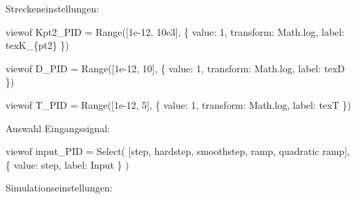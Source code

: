 \documentclass[
  letterpaper,
  DIV=11]{scrreprt}
\newenvironment{Shaded}{\begin{snugshade}}{\end{snugshade}}
\newcommand{\NormalTok}[1]{\textcolor[rgb]{0.00,0.23,0.31}{#1}}
\begin{document}
Streckeneinstellungen:

\begin{Shaded}
\begin{Highlighting}[]

\NormalTok{viewof Kpt2\_PID = Range([1e{-}12, 10e3], \{}
\NormalTok{  value: 1,}
\NormalTok{  transform: Math.log,}
\NormalTok{  label: tex\textasciigrave{}K\_\{pt2\}\textasciigrave{}}
\NormalTok{\})}

\NormalTok{viewof D\_PID = Range([1e{-}12, 10], \{}
\NormalTok{  value: 1,}
\NormalTok{  transform: Math.log,}
\NormalTok{  label: tex\textasciigrave{}D\textasciigrave{}}
\NormalTok{\})}

\NormalTok{viewof T\_PID = Range([1e{-}12, 5], \{}
\NormalTok{  value: 1,}
\NormalTok{  transform: Math.log,}
\NormalTok{  label: tex\textasciigrave{}T\textasciigrave{}}
\NormalTok{\})}
\end{Highlighting}
\end{Shaded}

Auswahl Eingangssignal:

\begin{Shaded}
\begin{Highlighting}[]

\NormalTok{viewof input\_PID = Select(}
\NormalTok{  [\textquotesingle{}step\textquotesingle{}, \textquotesingle{}hardstep\textquotesingle{}, \textquotesingle{}smoothstep\textquotesingle{}, \textquotesingle{}ramp\textquotesingle{}, \textquotesingle{}quadratic ramp\textquotesingle{}],}
\NormalTok{  \{}
\NormalTok{    value: \textquotesingle{}step\textquotesingle{},}
\NormalTok{    label: \textquotesingle{}Input\textquotesingle{}}
\NormalTok{  \}}
\NormalTok{)}
\end{Highlighting}
\end{Shaded}

Simulationseinstellungen:
\end{document}
